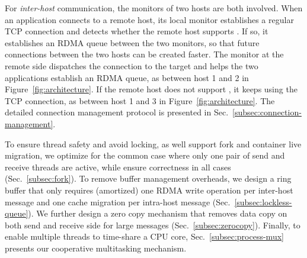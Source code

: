 
For \emph{inter-host} communication, the monitors of two hosts are both involved. When an application connects to a remote host, its local monitor establishes a regular TCP connection and detects whether the remote host supports \sys{}.
If so, it establishes an RDMA queue between the two monitors, so that future connections between the two hosts can be created faster. The monitor at the remote side dispatches the connection to the target and helps the two applications establish an RDMA queue, as between host 1 and 2 in Figure~\ref{fig:architecture}. If the remote host does not support \sys{}, it keeps using the TCP connection, as between host 1 and 3 in Figure~\ref{fig:architecture}. The detailed connection management protocol is presented in Sec.~\ref{subsec:connection-management}.

To ensure thread safety and avoid locking, as well support fork and container live migration, we optimize for the common case where only one pair of send and receive threads are active, while ensure correctness in all cases (Sec.~\ref{subsec:fork}).
To remove buffer management overheads, we design a ring buffer that only requires (amortized) one RDMA write operation per inter-host message and one cache migration per intra-host message (Sec.~\ref{subsec:lockless-queue}).
We further design a zero copy mechanism that removes data copy on both send and receive side for large messages (Sec.~\ref{subsec:zerocopy}).
Finally, to enable multiple threads to time-share a CPU core, Sec.~\ref{subsec:process-mux} presents our cooperative multitasking mechanism.

